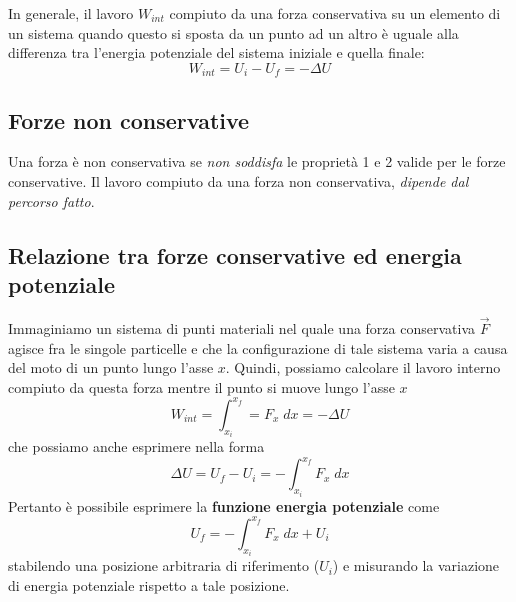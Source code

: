 \documentclass[a4paper,11pt,oneside]{book}
\begin{document}
In generale, il lavoro $W_{int}$ compiuto da una forza conservativa su un elemento di un sistema quando questo si sposta da un punto ad un altro è uguale alla differenza tra l’energia potenziale del sistema iniziale e quella finale:
\begin{equation*}
    W_{int} = U_i - U_f = -\Delta U
\end{equation*}

\subsection{Forze non conservative}
Una forza è non conservativa se \emph{non soddisfa} le proprietà 1 e 2 valide per le forze conservative. Il lavoro compiuto da una forza non conservativa, \emph{dipende dal percorso fatto}. 

\subsection{Relazione tra forze conservative ed energia potenziale}
Immaginiamo un sistema di punti materiali nel quale una forza conservativa $\vec{F}$ agisce fra le singole particelle e che la configurazione di tale sistema varia a causa del moto di un punto lungo l’asse $x$. 
Quindi, possiamo calcolare il lavoro interno compiuto da questa forza mentre il punto si muove lungo l’asse $x$
\begin{equation*}
    W_{int} = \int_{x_i}^{x_f} = F_x \; dx = -\Delta U
\end{equation*}
che possiamo anche esprimere nella forma
\begin{equation*}
    \Delta U = U_f - U_i = -\int_{x_i}^{x_f} F_x \; dx
\end{equation*}
Pertanto è possibile esprimere la \textbf{funzione energia potenziale} come
\begin{equation*}
    U_f = -\int_{x_i}^{x_f} F_x \; dx + U_i
\end{equation*}
stabilendo una posizione arbitraria di riferimento ($U_i$) e misurando la variazione di energia potenziale rispetto a tale posizione.
\end{document}
